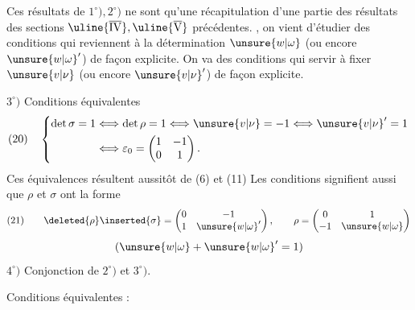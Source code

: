 Ces résultats de $1^\circ),2^\circ)$ ne sont qu'une récapitulation d'une partie des résultats des sections $\uline{\overline{\mathrm{IV}}},\uline{\overline{\mathrm{V}}}$ précédentes. , on vient d'étudier des conditions qui reviennent à la détermination  $\unsure{w|\omega}$ (ou encore  $\unsure{w|\omega}'$) de façon  explicite. On va  des conditions qui  servir à fixer $\unsure{v|\nu}$ (ou encore $\unsure{v|\nu}'$) de façon explicite.

$3^\circ)$ Conditions équivalentes
\[
(20)\quad\left\{\begin{aligned}
\det\sigma=1&\Longleftrightarrow\det\rho=1\Longleftrightarrow \unsure{v|\nu}=-1\Longleftrightarrow \unsure{v|\nu}'=1\\
&\Longleftrightarrow\varepsilon_0=\begin{pmatrix}1&-1\\0&1\end{pmatrix}.
\end{aligned}\right.
\]
Ces équivalences résultent aussitôt de (6) et (11) Les conditions signifient aussi que $\rho$ et $\sigma$ ont la forme
\[
(21)\qquad \deleted{\rho}\inserted{\sigma}=\begin{pmatrix}0&-1\\1&\unsure{w|\omega}'\end{pmatrix},\qquad\rho=\begin{pmatrix}0&1\\-1&\unsure{w|\omega}\end{pmatrix}
\]
\[
(\unsure{w|\omega}+\unsure{w|\omega}'=1)
\]
$4^\circ)$ Conjonction de $2^\circ)$ et $3^\circ)$.

Conditions équivalentes :


